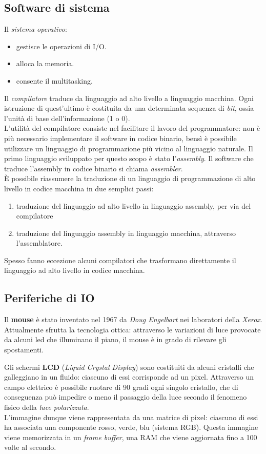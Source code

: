 \documentclass[class=book, crop=false]{standalone}
\begin{document}
\subsection{Software di sistema}
Il \emph{sistema operativo}:
\begin{itemize}[noitemsep]
	\item gestisce le operazioni di I/O.
	\item alloca la memoria.
	\item consente il multitasking.
\end{itemize}
Il \emph{compilatore} traduce da linguaggio ad alto livello a linguaggio macchina. Ogni istruzione di quest'ultimo è costituita da una determinata sequenza di \emph{bit}, ossia l'unità di base dell'informazione (1 o 0).\\
L'utilità del compilatore consiste nel facilitare il lavoro del programmatore: non è più necessario implementare il software in codice binario, bensì è possibile utilizzare un linguaggio di programmazione più vicino al linguaggio naturale. Il primo linguaggio sviluppato per questo scopo è stato l'\emph{assembly}. Il software che traduce l'assembly in codice binario si chiama \emph{assembler}.\\
\`{E} possibile riassumere la traduzione di un linguaggio di programmazione di alto livello in codice macchina in due semplici passi:
\begin{enumerate}[noitemsep]
	\item traduzione del linguaggio ad alto livello in linguaggio assembly, per via del compilatore
	\item traduzione del linguaggio assembly in linguaggio macchina, attraverso l'assemblatore.
\end{enumerate}
Spesso fanno eccezione alcuni compilatori che trasformano direttamente il linguaggio ad alto livello in codice macchina.

\subsection{Periferiche di IO}
Il \textbf{mouse} è stato inventato nel 1967 da \emph{Doug Engelbart} nei laboratori della \emph{Xerox}. Attualmente sfrutta la tecnologia ottica: attraverso le variazioni di luce provocate da alcuni led che illuminano il piano, il mouse è in grado di rilevare gli spostamenti.

Gli schermi \textbf{LCD} (\emph{Liquid Crystal Display}) sono costituiti da alcuni cristalli che galleggiano in un fluido: ciascuno di essi corrisponde ad un pixel. Attraverso un campo elettrico è possibile ruotare di 90 gradi ogni singolo cristallo, che di conseguenza può impedire o meno il passaggio della luce secondo il fenomeno fisico della \emph{luce polarizzata}.\\
L'immagine dunque viene rappresentata da una matrice di pixel: ciascuno di essi ha associata una componente rosso, verde, blu (sistema RGB). Questa immagine viene memorizzata in un \emph{frame buffer}, una RAM che viene aggiornata  fino a 100 volte al secondo.
\end{document}
